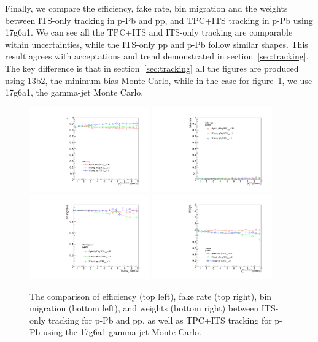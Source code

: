 Finally, we compare the efficiency, fake rate, bin migration and the weights between ITS-only tracking in p-Pb and pp, and TPC+ITS tracking in p-Pb using 17g6a1. We can see all the TPC+ITS and ITS-only tracking are comparable within uncertainties, while the ITS-only pp and p-Pb follow similar shapes. This result agrees with acceptations and trend demonstrated in section~\ref{sec:tracking}. The key difference is that in section~\ref{sec:tracking} all the figures are produced using 13b2, the minimum bias Monte Carlo, while in the case for figure~\ref{fig:TPCITSpp_pPbCompare}, we use 17g6a1, the gamma-jet Monte Carlo. 
\begin{figure}[h]
\center
\includegraphics[width=0.46\textwidth]{Appendices/ITSchi2_study_efficiency.pdf}
\includegraphics[width=0.46\textwidth]{Appendices/ITSchi2_study_fakerate.pdf}
\includegraphics[width=0.46\textwidth]{Appendices/ITSchi2_study_binMigration.pdf}
\includegraphics[width=0.46\textwidth]{Appendices/ITSchi2_study_weight.pdf}
\caption{The comparison of efficiency (top left), fake rate (top right), bin migration (bottom left), and weights (bottom right) between ITS-only tracking for p-Pb and pp, as well as TPC+ITS tracking for p-Pb using the 17g6a1 gamma-jet Monte Carlo.}
\label{fig:TPCITSpp_pPbCompare}
\end{figure}